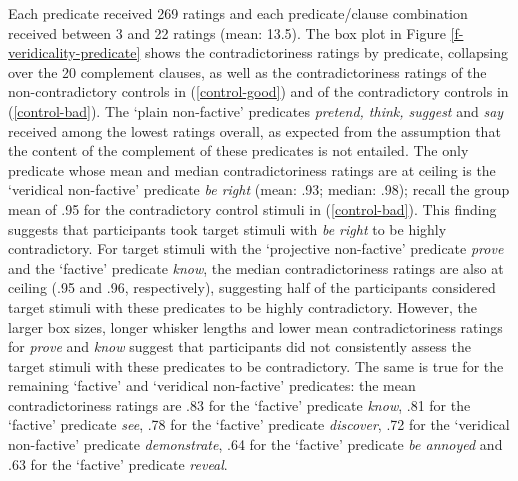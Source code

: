\documentclass[11pt,fleqn]{article}
\newcommand{\6}{\mbox{$[\hspace*{-.6mm}[$}}
\newcommand{\9}{\mbox{$]\hspace*{-.6mm}]$}}
\begin{document}
{Each predicate received 269 ratings and each predicate/clause combination received between 3 and 22 ratings (mean: 13.5). The box plot in Figure \ref{f-veridicality-predicate} shows the contradictoriness ratings by predicate, collapsing over the 20 complement clauses, as well as the contradictoriness ratings of the non-contradictory controls in (\ref{control-good}) and of the contradictory controls in (\ref{control-bad}). The `plain non-factive' predicates {\em pretend, think, suggest} and {\em say} received among the lowest ratings overall, as expected from the assumption that the content of the complement of these predicates is not entailed. The only predicate whose mean and median contradictoriness ratings are at ceiling is the `veridical non-factive' predicate {\em be right} (mean: .93; median: .98); recall the group mean of .95 for the contradictory control stimuli in (\ref{control-bad}). This finding suggests that participants took target stimuli with {\em be right} to be highly contradictory. For target stimuli with the `projective non-factive' predicate {\em prove} and the `factive' predicate {\em know}, the median contradictoriness ratings are also at ceiling (.95 and .96, respectively), suggesting half of the participants considered target stimuli with these predicates to be highly contradictory. However, the larger box sizes, longer whisker lengths and lower mean contradictoriness ratings for {\em prove} and {\em know} suggest that participants did not consistently assess the target stimuli with these predicates to be contradictory. The same is true for the remaining `factive' and `veridical non-factive' predicates: the mean contradictoriness ratings are .83 for the `factive' predicate {\em know}, .81 for the `factive' predicate {\em see}, .78 for the `factive' predicate {\em discover}, .72 for the `veridical non-factive' predicate {\em demonstrate}, .64 for the `factive' predicate {\em be annoyed} and .63 for the `factive' predicate {\em reveal}.  


}
\end{document}
